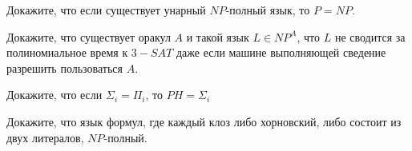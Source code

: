 \begin{ptask}{12}
	Докажите, что если существует унарный $NP$-полный язык, то $P = NP$.
\end{ptask}

\begin{ptask}{13}
    Докажите, что существует оракул $A$ и такой язык $L \in NP^A$, что $L$ не
    сводится за полиномиальное время к $3-SAT$ даже если машине выполняющей сведение
    разрешить пользоваться $A$.
\end{ptask}

\begin{ptask}{14}
    Докажите, что если $\Sigma_i = \Pi_i$, то $PH = \Sigma_i$
\end{ptask}

\begin{ptask}{15}
	Докажите, что язык формул, где каждый клоз либо хорновский, либо состоит из двух
    литералов, $NP$-полный.
\end{ptask}